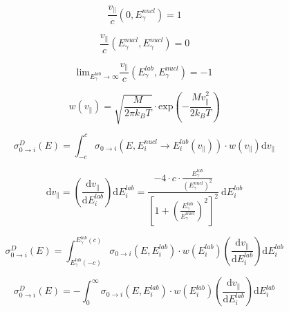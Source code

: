 \documentclass{article}
\begin{document}
\begin{equation}
\frac{v_\parallel}{c} \left( 0, E_\gamma^{nucl} \right) = 1
\end{equation}

\begin{equation}
	\frac{v_\parallel}{c} \left( E_\gamma^{nucl}, E_\gamma^{nucl} \right) = 0
\end{equation}

\begin{equation}
\mathrm{lim}_{E_\gamma^{lab} \to \infty} \frac{v_\parallel}{c} \left( E_\gamma^{lab}, E_\gamma^{nucl} \right) = -1
\end{equation}

\begin{equation}
\label{maxwell_boltzmann_distribution_2}
w\left(v_\parallel \right) = \sqrt{\frac{M}{2 \pi k_B T}} \cdot \mathrm{exp} \left( -\frac{M v_\parallel^2}{2 k_B T} \right) 
\end{equation}

\begin{equation}
\label{pseudo_convolution_v}
\sigma^{D}_{0 \to i} (E) = \int_{-c}^{c} \sigma_{0 \to i} (E, E_i^{nucl} \to E_i^{lab}(v_\parallel)) \cdot w(v_\parallel) \mathrm{d} v_\parallel
\end{equation}

\begin{equation}
\label{substitute_v_E}
\mathrm{d} v_\parallel = \left( \frac{\mathrm{d} v_\parallel}{\mathrm{d} E_i^{lab}} \right) \mathrm{d} E_i^{lab} = \frac{- 4 \cdot c \cdot \frac{E_\gamma^{lab}}{\left( E_\gamma^{nucl} \right)^2}}{ \left[ 1 + \left( \frac{E_\gamma^{lab}}{E_\gamma^{nucl}} \right)^2 \right]^2} ~ \mathrm{d} E_i^{lab}
\end{equation}

\begin{equation}
\label{pseudo_convolution_E_0}
\sigma^{D}_{0 \to i} (E) = \int_{E_\gamma^{lab} \left(-c \right)}^{E_\gamma^{lab} \left(c \right)} \sigma_{0 \to i} (E, E_i^{lab}) \cdot w(E_i^{lab}) \left( \frac{\mathrm{d} v_\parallel}{\mathrm{d} E_i^{lab}} \right) \mathrm{d} E_i^{lab}
\end{equation}

\begin{equation}
\label{pseudo_convolution_E}
\sigma^{D}_{0 \to i} (E) = - \int_{0}^{\infty} \sigma_{0 \to i} (E, E_i^{lab}) \cdot w(E_i^{lab}) \left( \frac{\mathrm{d} v_\parallel}{\mathrm{d} E_i^{lab}} \right) \mathrm{d} E_i^{lab}
\end{equation}
\end{document}

